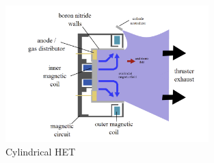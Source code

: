 \begin{figure}[H]
    \centering
    \includegraphics[width=0.7\textwidth]{images/Concepts/CHT.png}
    \captionsetup{justification=centering}
    \caption{Cylindrical \ac{HET} \cite{pigeon2017development}}
    \label{fig:cylindrical_HET}
\end{figure}